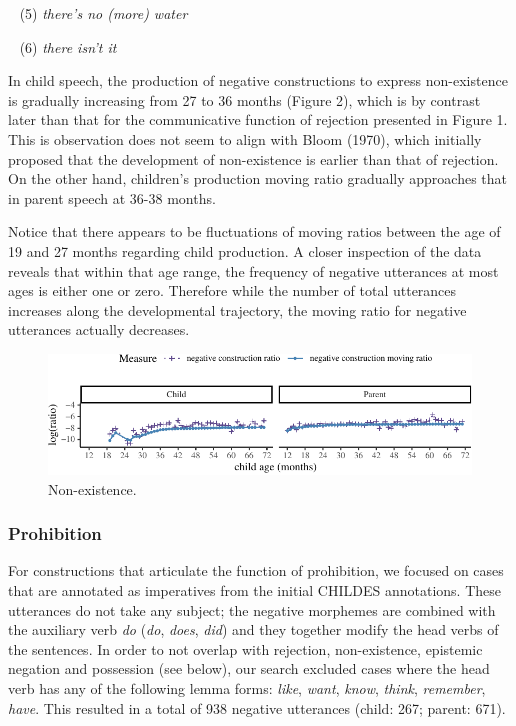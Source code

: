 \documentclass[10pt, letterpaper]{article}
\newenvironment{CodeChunk}{}{}
\begin{document}
~ (5) \emph{there's no (more) water}

~ (6) \emph{there isn't it}

In child speech, the production of negative constructions to express
non-existence is gradually increasing from 27 to 36 months (Figure 2),
which is by contrast later than that for the communicative function of
rejection presented in Figure 1. This is observation does not seem to
align with Bloom (1970), which initially proposed that the development
of non-existence is earlier than that of rejection. On the other hand,
children's production moving ratio gradually approaches that in parent
speech at 36-38 months.

Notice that there appears to be fluctuations of moving ratios between
the age of 19 and 27 months regarding child production. A closer
inspection of the data reveals that within that age range, the frequency
of negative utterances at most ages is either one or zero. Therefore
while the number of total utterances increases along the developmental
trajectory, the moving ratio for negative utterances actually decreases.

\begin{figure}[h]

\begin{CodeChunk}


\begin{center}\includegraphics{figs/existence-1} \end{center}

\end{CodeChunk}
\caption[This image spans both columns]{Non-existence.}\label{fig:non-existence}
\end{figure}

\hypertarget{prohibition}{%
\subsubsection{Prohibition}\label{prohibition}}

For constructions that articulate the function of prohibition, we
focused on cases that are annotated as imperatives from the initial
CHILDES annotations. These utterances do not take any subject; the
negative morphemes are combined with the auxiliary verb \emph{do}
(\emph{do}, \emph{does}, \emph{did}) and they together modify the head
verbs of the sentences. In order to not overlap with rejection,
non-existence, epistemic negation and possession (see below), our search
excluded cases where the head verb has any of the following lemma forms:
\emph{like}, \emph{want}, \emph{know}, \emph{think}, \emph{remember},
\emph{have}. This resulted in a total of 938 negative utterances (child:
267; parent: 671).
\end{document}
